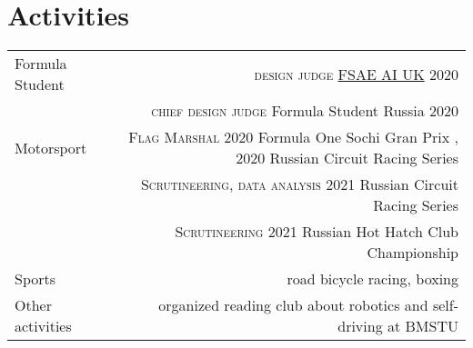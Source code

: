 \section*{Activities}
\begin{tabular}{@{}L!{\VRule}R}
    
    Formula Student & {\textsc{design judge}} \href{https://www.imeche.org/events/formula-student/team-information/fs-ai}{FSAE AI UK} 2020 \\
                    & {\textsc{chief design judge}} Formula Student Russia 2020 \\
    Motorsport      & {\textsc{Flag Marshal}} 2020 Formula One Sochi Gran Prix , 2020 Russian Circuit Racing Series \\
                    & {\textsc{Scrutineering, data analysis}} 2021 Russian Circuit Racing Series \\
                    & {\textsc{Scrutineering}} 2021 Russian Hot Hatch Club Championship \\ 
    Sports   & road bicycle racing, boxing \\
    Other activities & organized reading club about robotics and self-driving at BMSTU
\end{tabular}